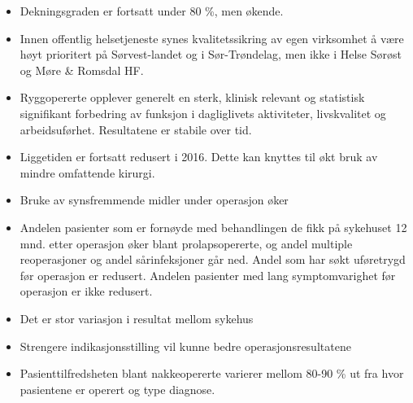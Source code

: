 \documentclass [norsk,a4paper,twoside]{article}\usepackage[]{graphicx}\usepackage[]{color}
\begin{document}
\begin{itemize}
\item Dekningsgraden er fortsatt under 80 \%, men økende.
\item Innen offentlig helsetjeneste synes kvalitetssikring av egen virksomhet å
være høyt prioritert på Sørvest-landet og i Sør-Trøndelag, men ikke i Helse
Sørøst og Møre & Romsdal HF.
\item Ryggopererte opplever generelt en sterk, klinisk relevant og statistisk
signifikant forbedring av funksjon i dagliglivets aktiviteter, livskvalitet og
arbeidsuførhet. Resultatene er stabile over tid.
\item Liggetiden er fortsatt redusert i 2016. Dette kan knyttes til økt bruk av
mindre omfattende kirurgi.
\item Bruke av synsfremmende midler under operasjon øker
\item Andelen pasienter som er fornøyde med behandlingen de fikk på sykehuset
12 mnd. etter operasjon øker blant prolapsopererte, og andel multiple
reoperasjoner og andel sårinfeksjoner går ned. Andel som har søkt
uføretrygd før operasjon er redusert. Andelen pasienter med lang
symptomvarighet før operasjon er ikke redusert.
\item Det er stor variasjon i resultat mellom sykehus
\item Strengere indikasjonsstilling vil kunne bedre operasjonsresultatene
\item Pasienttilfredsheten blant nakkeopererte varierer mellom 80-90 \% ut fra
hvor pasientene er operert og type diagnose.
\end{itemize}
\end{document}
